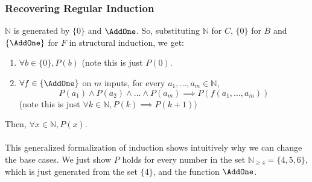 \documentclass{article}
\begin{document}
\subsubsection{Recovering Regular Induction}
$\mathbb{N}$ is generated by $\{0\}$ and $\AddOne$. So, substituting $\mathbb{N}$ for $C$, $\{0\}$ for $B$ and $\{\AddOne\}$ for $F$ in structural induction, we get:
\begin{enumerate}
    \item $\forall b \in \{0\}, P(b)$ (note this is just $P(0)$.
    \item $\forall f \in \{\AddOne\}$ on $m$ inputs, for every $a_1, ..., a_m \in \mathbb{N}$,
    $$P(a_1) \land P(a_2) \land ... \land P(a_m) \implies P(f(a_1, ..., a_m))$$
    (note this is just $\forall k \in \mathbb{N}, P(k) \implies P(k + 1))$
\end{enumerate}
Then, $\forall x \in \mathbb{N}, P(x)$.\\
\\
This generalized formalization of induction shows intuitively why we can change the base cases. We just show $P$ holds for every number in the set $\mathbb{N}_{\geq 4} = \{4,5,6\}$, which is just generated from the set $\{4\}$, and the function $\AddOne$.
\end{document}
